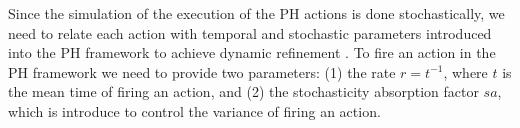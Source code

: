 Since the simulation of the execution of the PH actions is done stochastically, we need to relate each action with temporal 
and stochastic parameters introduced into the PH framework to achieve dynamic refinement \cite{PMR10-TCSB}. 
To fire an action in the PH framework we need to provide two parameters: (1) the rate $r=t^{-1}$, where $t$ is the mean time of firing an action,
and (2) the stochasticity absorption factor $sa$, which is introduce to control the variance of firing an action.






